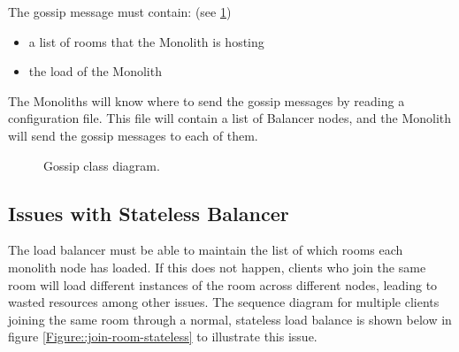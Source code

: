 The gossip message must contain: (see \ref{Figure::gossip-class-diag})
\begin{itemize}
  \item a list of rooms that the Monolith is hosting
  \item the load of the Monolith
\end{itemize}

The Monoliths will know where to send the gossip messages by reading a configuration file. This file will contain a list of Balancer nodes, and the Monolith will send the gossip messages to each of them.

\begin{figure}[!htb]
  \centering
  \caption{\label{Figure::gossip-class-diag} Gossip class diagram.}
\end{figure}

\subsection{Issues with Stateless Balancer}

The load balancer must be able to maintain the list of which rooms each monolith node has loaded. If this does not happen, clients who join the same room will load different instances of the room across different nodes, leading to wasted resources among other issues. The sequence diagram for multiple clients joining the same room through a normal, stateless load balance is shown below in figure \ref{Figure::join-room-stateless} to illustrate this issue.

